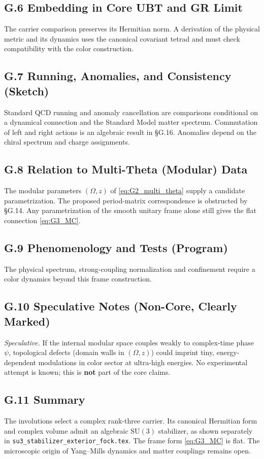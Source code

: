 \subsection*{G.6 Embedding in Core UBT and GR Limit}
The carrier comparison preserves its Hermitian norm. A derivation of the
physical metric and its dynamics uses the canonical covariant tetrad and
must check compatibility with the color construction.

\subsection*{G.7 Running, Anomalies, and Consistency (Sketch)}
Standard QCD running and anomaly cancellation are comparisons conditional
on a dynamical connection and the Standard Model matter spectrum.
Commutation of left and right actions is an algebraic result in \S G.16.
Anomalies depend on the chiral spectrum and charge assignments.

\subsection*{G.8 Relation to Multi-Theta (Modular) Data}
The modular parameters $(\Omega,z)$ of \eqref{eq:G2_multi_theta} supply a
candidate parametrization. The proposed period-matrix correspondence is
obstructed by \S G.14. Any parametrization of the smooth unitary frame alone
still gives the flat connection \eqref{eq:G3_MC}.

\subsection*{G.9 Phenomenology and Tests (Program)}
The physical spectrum, strong-coupling normalization and confinement
require a color dynamics beyond this frame construction.

\subsection*{G.10 Speculative Notes (Non-Core, Clearly Marked)}
\emph{Speculative.} If the internal modular space couples weakly to complex-time phase $\psi$, topological defects (domain walls in $(\Omega,z)$) could imprint tiny, energy-dependent modulations in color sector at ultra-high energies. No experimental attempt is known; this is \textbf{not} part of the core claims.

\subsection*{G.11 Summary}
The involutions select a complex rank-three carrier. Its canonical
Hermitian form and complex volume admit an algebraic $\mathrm{SU}(3)$
stabilizer, as shown separately in
\texttt{su3\_stabilizer\_exterior\_fock.tex}. The frame form
\eqref{eq:G3_MC} is flat. The microscopic origin of Yang--Mills dynamics
and matter couplings remains open.

